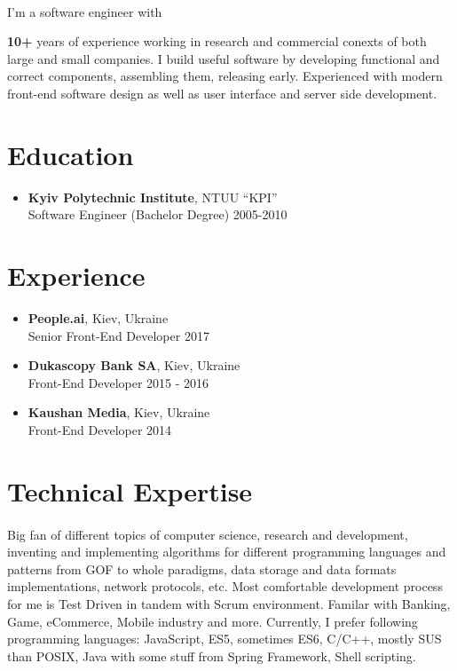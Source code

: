 \documentclass[a4paper,13pt]{article}
\begin{document}
\paragraph{} I'm a software engineer with {\textbf {\small{10+}} years of experience working in research and commercial
conexts of both large and small companies. I build useful software by developing functional and correct
components, assembling them, releasing early. Experienced with modern front-end software design as well as
user interface and server side development.

%
%

\section*{Education}
\begin{itemize}[itemsep=-4pt,label=]
  \item \textbf{Kyiv Polytechnic Institute}, NTUU ``KPI'' \\
  Software Engineer (Bachelor Degree) \hfill 2005-2010
\end{itemize}

%
%

\section*{Experience}
\begin{itemize}[itemsep=4pt,label=]

  \item \textbf{People.ai}, Kiev, Ukraine\\
    Senior Front-End Developer \hfill  2017

  \item \textbf{Dukascopy Bank SA}, Kiev, Ukraine\\
    Front-End Developer \hfill  2015 - 2016

  \item \textbf{Kaushan Media}, Kiev, Ukraine \\
    Front-End Developer \hfill  2014

\end{itemize}

%
%

\section*{Technical Expertise}
\paragraph{} Big fan of different topics of computer science, research and development,
inventing and implementing algorithms for different programming languages and patterns 
from GOF to whole paradigms, data storage and data formats implementations, network protocols, etc. Most comfortable development process for me is Test Driven in tandem with Scrum environment. Familar with Banking, Game, eCommerce, Mobile industry and more.
Currently, I prefer following programming languages: JavaScript, ES5,
sometimes ES6, C/C++, mostly SUS than POSIX, Java with some stuff from Spring Framework, Shell scripting.
%
%

}
\end{document}
